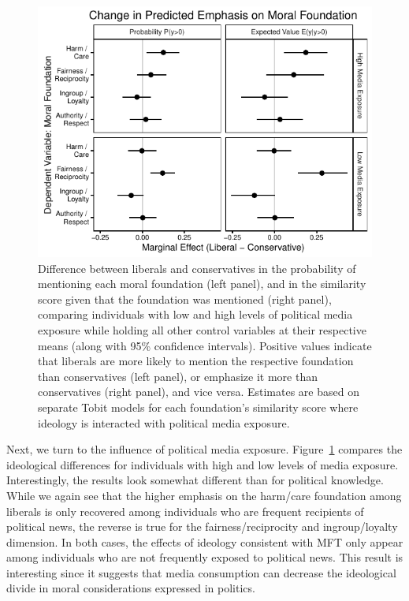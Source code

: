 \documentclass[12pt]{article}
\begin{document}
\begin{figure}[ht]\centering
\includegraphics{../calc/fig/tobit_ideol_media.pdf}
\caption{Difference between liberals and conservatives in the probability of mentioning each moral foundation (left panel), and in the similarity score given that the foundation was mentioned (right panel), comparing individuals with low and high levels of political media exposure while holding all other control variables at their respective means (along with 95\% confidence intervals). Positive values indicate that liberals are more likely to mention the respective foundation than conservatives (left panel), or emphasize it more than conservatives (right panel), and vice versa. Estimates are based on separate Tobit models for each foundation's similarity score where ideology is interacted with political media exposure.}\label{fig:tobit_ideol_media}
\end{figure}

Next, we turn to the influence of political media exposure. Figure~\ref{fig:tobit_ideol_media} compares the ideological differences for individuals with high and low levels of media exposure. Interestingly, the results look somewhat different than for political knowledge. While we again see that the higher emphasis on the harm/care foundation among liberals is only recovered among individuals who are frequent recipients of political news, the reverse is true for the fairness/reciprocity and ingroup/loyalty dimension. In both cases, the effects of ideology consistent with MFT only appear among individuals who are not frequently exposed to political news. This result is interesting since it suggests that media consumption can decrease the ideological divide in moral considerations expressed in politics.
\end{document}
